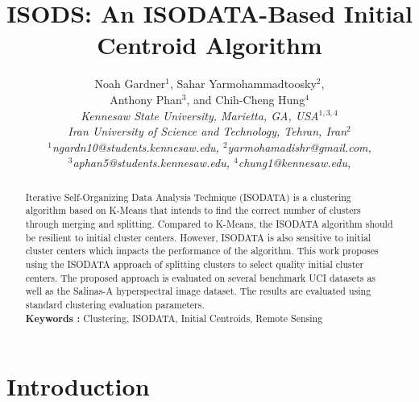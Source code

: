 \documentclass[a4paper,10pt]{article}
\begin{document}
\title{\bf ISODS: An ISODATA-Based Initial Centroid Algorithm}
\author{Noah Gardner$^1$, Sahar Yarmohammadtoosky$^2$, \\
      Anthony Phan$^3$, and Chih-Cheng Hung$^4$\\[1ex]
      \sl \small Kennesaw State University, Marietta, GA, USA$^{1, 3, 4}$\\
      \sl \small Iran University of Science and Technology, Tehran,
      Iran$^2$\\[1ex]
      \small $^1$ngardn10@students.kennesaw.edu, \small
      $^2$yarmohamadishr@gmail.com, \\
      \small $^3$aphan5@students.kennesaw.edu, \small $^4$chung1@kennesaw.edu,
      \\}
\date{}
\maketitle

\begin{abstract}
      \noindent 
      Iterative Self-Organizing Data Analysis Technique (ISODATA) is a
      clustering algorithm based on K-Means that intends to find the correct
      number of clusters through merging and splitting. Compared to K-Means, the
      ISODATA algorithm should be resilient to initial cluster centers. However,
      ISODATA is also sensitive to initial cluster centers which impacts the
      performance of the algorithm. This work proposes using the ISODATA
      approach of splitting clusters to select quality initial cluster centers.
      The proposed approach is evaluated on several benchmark UCI datasets as
      well as the Salinas-A hyperspectral image dataset. The results are
      evaluated using standard clustering evaluation parameters. \\
      {\bf Keywords :} Clustering, ISODATA, Initial Centroids, Remote Sensing
\end{abstract}




\section{Introduction}
\end{document}
